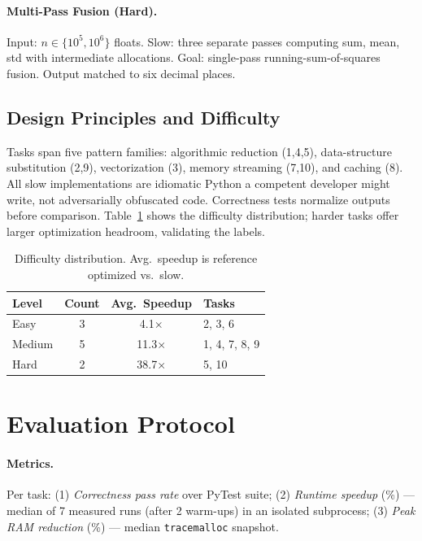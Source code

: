 \documentclass{article}
\begin{document}
\paragraph{Multi-Pass Fusion (Hard).} Input: $n \in \{10^5,10^6\}$ floats. Slow: three separate passes computing sum, mean, std with intermediate allocations. Goal: single-pass running-sum-of-squares fusion. Output matched to six decimal places.

\subsection{Design Principles and Difficulty}
Tasks span five pattern families: algorithmic reduction (1,4,5), data-structure substitution (2,9), vectorization (3), memory streaming (7,10), and caching (8). All slow implementations are idiomatic Python a competent developer might write, not adversarially obfuscated code. Correctness tests normalize outputs before comparison. Table~\ref{tab:difficulty} shows the difficulty distribution; harder tasks offer larger optimization headroom, validating the labels.

\begin{table}[h]
\centering
\caption{Difficulty distribution. Avg.\ speedup is reference optimized vs.\ slow.}
\label{tab:difficulty}
\small
\begin{tabular}{lccl}
\toprule
\textbf{Level} & \textbf{Count} & \textbf{Avg.\ Speedup} & \textbf{Tasks} \\
\midrule
Easy   & 3 & 4.1$\times$  & 2, 3, 6 \\
Medium & 5 & 11.3$\times$ & 1, 4, 7, 8, 9 \\
Hard   & 2 & 38.7$\times$ & 5, 10 \\
\bottomrule
\end{tabular}
\end{table}

\section{Evaluation Protocol}

\paragraph{Metrics.} Per task: (1) \emph{Correctness pass rate} over PyTest suite; (2) \emph{Runtime speedup} (\%) --- median of 7 measured runs (after 2 warm-ups) in an isolated subprocess; (3) \emph{Peak RAM reduction} (\%) --- median \texttt{tracemalloc} snapshot.
\end{document}
